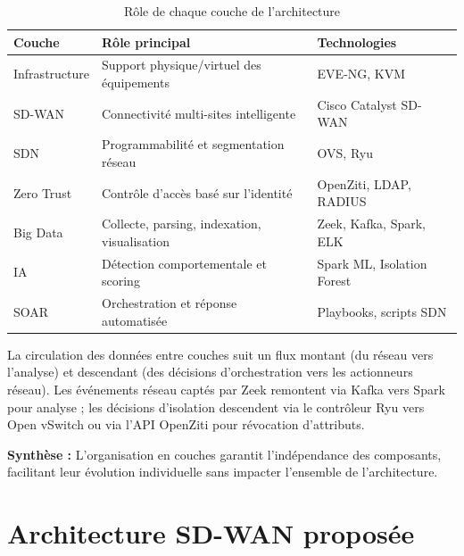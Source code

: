 \documentclass[12pt,a4paper,oneside]{report}
\begin{document}
	\begin{table}[H]
		\centering
		\caption{Rôle de chaque couche de l'architecture}
		\renewcommand{\arraystretch}{1.4}
		\begin{tabularx}{\textwidth}{|l|X|l|}
			\hline
			\textbf{Couche} & \textbf{Rôle principal} & \textbf{Technologies} \\
			\hline
			Infrastructure & Support physique/virtuel des équipements & EVE-NG, KVM \\
			\hline
			SD-WAN & Connectivité multi-sites intelligente & Cisco Catalyst SD-WAN \\
			\hline
			SDN & Programmabilité et segmentation réseau & OVS, Ryu \\
			\hline
			Zero Trust & Contrôle d'accès basé sur l'identité & OpenZiti, LDAP, RADIUS \\
			\hline
			Big Data & Collecte, parsing, indexation, visualisation & Zeek, Kafka, Spark, ELK \\
			\hline
			IA & Détection comportementale et scoring & Spark ML, Isolation Forest \\
			\hline
			SOAR & Orchestration et réponse automatisée & Playbooks, scripts SDN \\
			\hline
		\end{tabularx}
	\end{table}
	
	La circulation des données entre couches suit un flux montant (du réseau
	vers l'analyse) et descendant (des décisions d'orchestration vers les actionneurs
	réseau). Les événements réseau captés par Zeek remontent via Kafka vers Spark
	pour analyse ; les décisions d'isolation descendent via le contrôleur Ryu
	vers Open vSwitch ou via l'API OpenZiti pour révocation d'attributs.
	
	\begin{mdframed}[linecolor=black,roundcorner=4pt,innertopmargin=8pt,innerbottommargin=8pt]
		\textbf{Synthèse :} L'organisation en couches garantit l'indépendance des
		composants, facilitant leur évolution individuelle sans impacter l'ensemble
		de l'architecture.
	\end{mdframed}
	
	\section{Architecture SD-WAN proposée}
	
\end{document}
